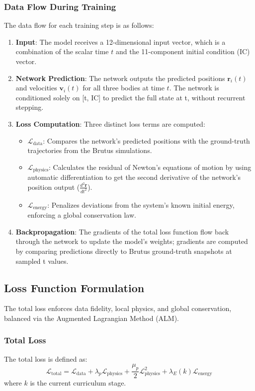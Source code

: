 \subsubsection{Data Flow During Training}
The data flow for each training step is as follows:
\begin{enumerate}
    \item \textbf{Input}: The model receives a 12-dimensional input vector, which is a combination of the scalar time $t$ and the 11-component initial condition (IC) vector.
    \item \textbf{Network Prediction}: The network outputs the predicted positions $\mathbf{r}_i(t)$ and velocities $\mathbf{v}_i(t)$ for all three bodies at time $t$. The network is conditioned solely on [t, IC] to predict the full state at t, without recurrent stepping.
    \item \textbf{Loss Computation}: Three distinct loss terms are computed:
    \begin{itemize}
        \item $\mathcal{L}_{\text{data}}$: Compares the network's predicted positions with the ground-truth trajectories from the Brutus simulations.
        \item $\mathcal{L}_{\text{physics}}$: Calculates the residual of Newton's equations of motion by using automatic differentiation to get the second derivative of the network's position output ($\frac{d^2\mathbf{r}}{dt^2}$).
        \item $\mathcal{L}_{\text{energy}}$: Penalizes deviations from the system's known initial energy, enforcing a global conservation law.
    \end{itemize}
    \item \textbf{Backpropagation}: The gradients of the total loss function flow back through the network to update the model's weights; gradients are computed by comparing predictions directly to Brutus ground-truth snapshots at sampled t values.
\end{enumerate}

\subsection{Loss Function Formulation}

The total loss enforces data fidelity, local physics, and global conservation, balanced via the Augmented Lagrangian Method (ALM).

\subsubsection*{Total Loss}
The total loss is defined as:
\begin{equation}
\mathcal{L}_{\text{total}} = \mathcal{L}_{\text{data}} + \lambda_{p}\mathcal{L}_{\text{physics}} + \frac{\mu_{p}}{2}\mathcal{L}_{\text{physics}}^{2} + \lambda_{E}(k)\mathcal{L}_{\text{energy}}
\end{equation}
where $k$ is the current curriculum stage.

